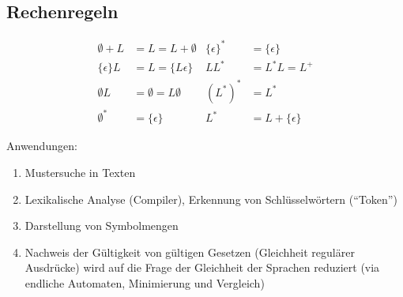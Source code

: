 \subsection{Rechenregeln}
\begin{align*}
	\emptyset + L &= L = L + \emptyset 			&  \{\epsilon\}^* &= \{\epsilon\}\\
 	\{\epsilon\} L &= L = \{L\epsilon\} 			& LL^* &= L^*L = L^+\\
 	\emptyset L & = \emptyset = L \emptyset 	& (L^*)^* &= L^*\\
 	\emptyset^* &= \{\epsilon\} & L^* 			&= L + \{\epsilon\}
\end{align*}

Anwendungen:
\begin{enumerate}\itemsep0em
	\item Mustersuche in Texten
	\item Lexikalische Analyse (Compiler), Erkennung von Schlüsselwörtern (\enquote{Token})
	\item Darstellung von Symbolmengen
	\item Nachweis der Gültigkeit von gültigen Gesetzen (Gleichheit regulärer Ausdrücke) wird
	auf die Frage der Gleichheit der Sprachen reduziert (via endliche Automaten, Minimierung und Vergleich)
\end{enumerate}
